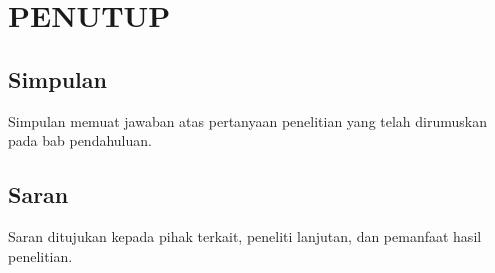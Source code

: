 \chapter{PENUTUP}
\section{Simpulan}
Simpulan memuat jawaban atas pertanyaan penelitian yang telah dirumuskan pada bab pendahuluan.

\section{Saran}
Saran ditujukan kepada pihak terkait, peneliti lanjutan, dan pemanfaat hasil penelitian.
